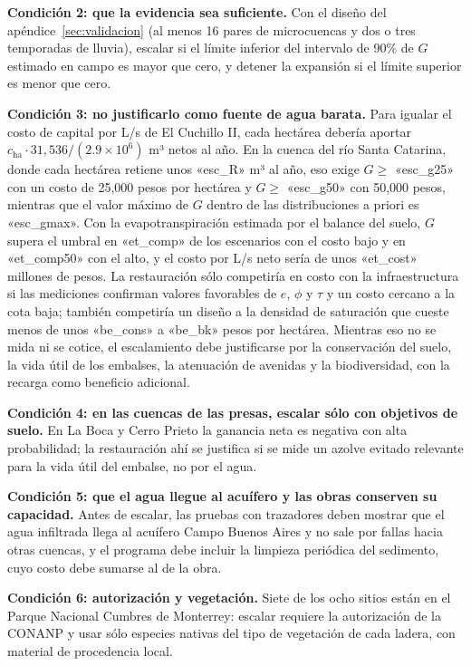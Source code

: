 \textbf{Condición 2: que la evidencia sea suficiente.} Con el diseño del apéndice~\ref{sec:validacion} (al menos 16 pares de microcuencas y dos o tres temporadas de lluvia), escalar si el límite inferior del intervalo de 90\% de $G$ estimado en campo es mayor que cero, y detener la expansión si el límite superior es menor que cero.

\textbf{Condición 3: no justificarlo como fuente de agua barata.} Para igualar el costo de capital por L/s de El Cuchillo II, cada hectárea debería aportar $c_{\text{ha}}\cdot 31{,}536/(2.9\times10^6)$ m³ netos al año. En la cuenca del río Santa Catarina, donde cada hectárea retiene unos «esc_R» m³ al año, eso exige $G\ge$ «esc_g25» con un costo de 25,000 pesos por hectárea y $G\ge$ «esc_g50» con 50,000 pesos, mientras que el valor máximo de $G$ dentro de las distribuciones a priori es «esc_gmax». Con la evapotranspiración estimada por el balance del suelo, $G$ supera el umbral en «et_comp» de los escenarios con el costo bajo y en «et_comp50» con el alto, y el costo por L/s neto sería de unos «et_cost» millones de pesos. La restauración sólo competiría en costo con la infraestructura si las mediciones confirman valores favorables de $e$, $\phi$ y $\tau$ y un costo cercano a la cota baja; también competiría un diseño a la densidad de saturación que cueste menos de unos «be_cons» a «be_bk» pesos por hectárea. Mientras eso no se mida ni se cotice, el escalamiento debe justificarse por la conservación del suelo, la vida útil de los embalses, la atenuación de avenidas y la biodiversidad, con la recarga como beneficio adicional.

\textbf{Condición 4: en las cuencas de las presas, escalar sólo con objetivos de suelo.} En La Boca y Cerro Prieto la ganancia neta es negativa con alta probabilidad; la restauración ahí se justifica si se mide un azolve evitado relevante para la vida útil del embalse, no por el agua.

\textbf{Condición 5: que el agua llegue al acuífero y las obras conserven su capacidad.} Antes de escalar, las pruebas con trazadores deben mostrar que el agua infiltrada llega al acuífero Campo Buenos Aires y no sale por fallas hacia otras cuencas, y el programa debe incluir la limpieza periódica del sedimento, cuyo costo debe sumarse al de la obra.

\textbf{Condición 6: autorización y vegetación.} Siete de los ocho sitios están en el Parque Nacional Cumbres de Monterrey: escalar requiere la autorización de la CONANP y usar sólo especies nativas del tipo de vegetación de cada ladera, con material de procedencia local.

